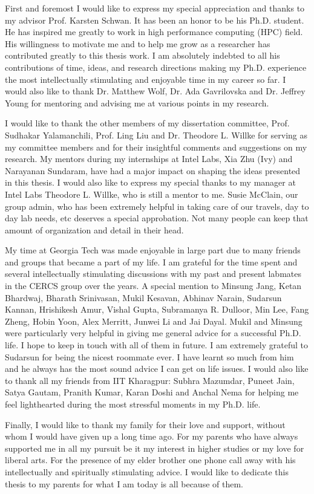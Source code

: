 First and foremost I would like to express my special appreciation and thanks to my advisor Prof. Karsten Schwan. It has been an honor to be his Ph.D. student. He has inspired me greatly to work in high performance computing (HPC) field. His willingness to motivate me and to help me grow as a researcher has contributed greatly to this thesis work. I am absolutely indebted to all his contributions of time, ideas, and research directions making my Ph.D. experience the most intellectually stimulating and enjoyable time in my career so far. I would also like to thank Dr. Matthew Wolf, Dr. Ada Gavrilovska and Dr. Jeffrey Young for mentoring and advising me at various points in my research. 

I would like to thank the other members of my dissertation committee, Prof. Sudhakar Yalamanchili, Prof. Ling Liu and Dr. Theodore L. Willke for serving as my committee members and for their insightful comments and suggestions on my research. My mentors during my internships at Intel Labs, Xia Zhu (Ivy) and Narayanan Sundaram, have had a major impact on shaping the ideas presented in this thesis. I would also like to express my special thanks to my manager at Intel Labs Theodore L. Willke, who is still a mentor to me. Susie McClain, our group admin, who has been extremely helpful in taking care of our travels, day to day lab needs, etc deserves a special approbation. Not many people can keep that amount of organization and detail in their head.

My time at Georgia Tech  was made enjoyable in large part due to many friends and groups that became a part of my life. I am grateful for the time spent and several intellectually stimulating discussions with my past and present labmates in the CERCS group over the years. A special mention to Minsung Jang, Ketan Bhardwaj, Bharath Srinivasan, Mukil Kesavan, Abhinav Narain, Sudarsun Kannan, Hrishikesh Amur, Vishal Gupta, Subramanya R. Dulloor, Min Lee, Fang Zheng, Hobin Yoon, Alex Merritt, Junwei Li and Jai Dayal. Mukil and Minsung were particularly very helpful in giving me general advice for a successful Ph.D. life. I hope to keep in touch with all of them in future. I am extremely grateful to Sudarsun for being the nicest roommate ever. I have learnt so much from him and he always has the most sound advice I can get on life issues. I would also like to thank all my friends from IIT Kharagpur: Subhra Mazumdar, Puneet Jain, Satya Gautam, Pranith Kumar, Karan Doshi and Anchal Nema for helping me feel lighthearted during the most stressful moments in my Ph.D. life. 

Finally, I would like to thank my family for their love and support, without whom I would have given up a long time ago. For my parents who have always supported me in all my pursuit be it my interest in higher studies or my love for liberal arts. For the presence of my elder brother one phone call away with his intellectually and spiritually stimulating advice. I would like to dedicate this thesis to my parents for what I am today is all because of them.	
